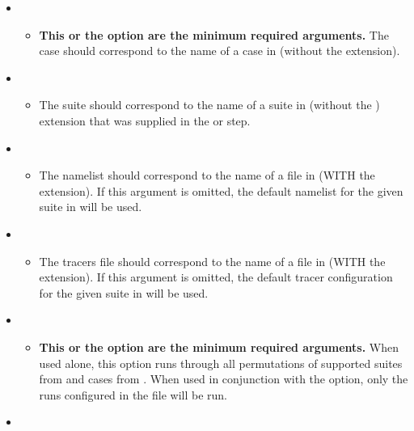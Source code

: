 \begin{itemize}
\item {}
	\begin{itemize}
	\item \textbf{This or the  option are the minimum required arguments.} The case should correspond to the name of a case in  (without the  extension).
	\end{itemize}
\item {}
	\begin{itemize}
	\item The suite should correspond to the name of a suite in  (without the ) extension that was supplied in the  or  step.
	\end{itemize}
\item {}
	\begin{itemize}
	\item The namelist should correspond to the name of a file in  (WITH the  extension). If this argument is omitted, the default namelist for the given suite in  will be used.
	\end{itemize}
\item {}
	\begin{itemize}
	\item The tracers file should correspond to the name of a file in  (WITH the  extension). If this argument is omitted, the default tracer configuration for the given suite in  will be used.
	\end{itemize}
\item {}
	\begin{itemize}
	\item \textbf{This or the  option are the minimum required arguments.} When used alone, this option runs through all permutations of supported suites from  and cases from . When used in conjunction with the  option, only the runs configured in the file will be run.
	\end{itemize}
\item {}
	\begin{itemize}

\end{itemize}
\end{itemize}
